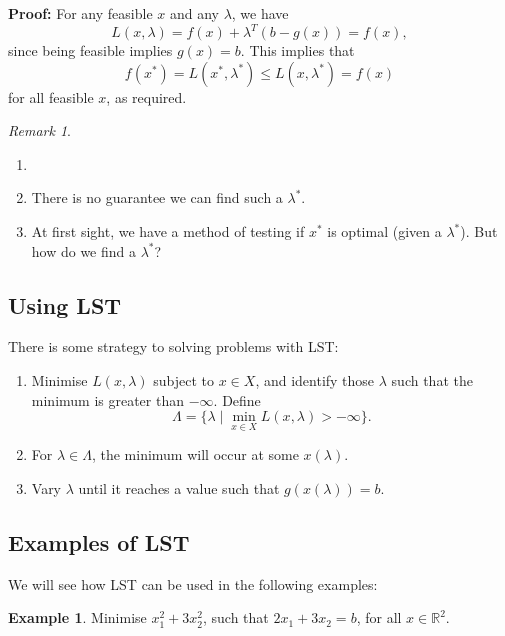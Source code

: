 \documentclass[12pt]{article}
\theoremstyle{definition}
\newtheorem{example}{Example}[section]
\theoremstyle{remark}
\newtheorem*{remark}{Remark}
\begin{document}
\begin{adjustbox}{minipage = \columnwidth - 25.5pt, margin=1em, frame=1pt, margin=0em}
\textbf{Proof:} For any feasible $x$ and any $\lambda$, we have
\[
L(x, \lambda) = f(x) + \lambda^{T}(b - g(x)) = f(x)
,\]
since being feasible implies $g(x) = b$. This implies that
\[
	f(x^{\ast}) = L(x^{\ast}, \lambda^{\ast}) \leq L(x, \lambda^{\ast}) = f(x)
\]
for all feasible $x$, as required.
\end{adjustbox}

\begin{remark}
	\begin{enumerate}[1.]
		\item[]
		\item There is no guarantee we can find such a $\lambda^{\ast}$.
		\item At first sight, we have a method of testing if $x^{\ast}$ is optimal (given a $\lambda^{\ast}$). But how do we find a $\lambda^{\ast}$?
	\end{enumerate}
\end{remark}

\subsection{Using LST}%
\label{sub:using_lst}

There is some strategy to solving problems with LST:

\begin{enumerate}[1)]
	\item Minimise $L(x, \lambda)$ subject to $x \in X$, and identify those $\lambda$ such that the minimum is greater than $-\infty$. Define
		\[
			\Lambda = \{ \lambda \mid \min_{x \in X} L(x, \lambda) > - \infty \}
		.\]
	\item For $\lambda \in \Lambda$, the minimum will occur at some $x(\lambda)$.
	\item Vary $\lambda$ until it reaches a value such that $g(x(\lambda)) = b$.
\end{enumerate}

\subsection{Examples of LST}%
\label{sub:examples_of_lst}

We will see how LST can be used in the following examples:

\begin{example}
\label{ex:3.1}
	Minimise $x_1^2 + 3x_2^2$, such that $2x_1 + 3x_2 = b$, for all $x \in \mathbb{R}^2$.
\end{example}
\end{document}
